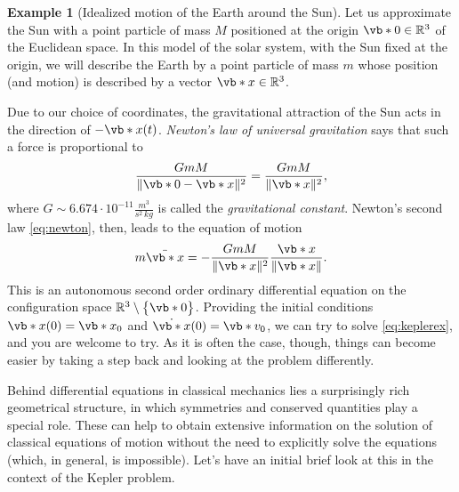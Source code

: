 \documentclass[english,fontsize=11pt,paper=b5]{scrbook}
\theoremstyle{definition}
\newtheorem{example}{Example}[chapter]
\newcommand{\emphidx}[1]{\index{#1}\emph{#1}}
\begin{document}
  \begin{example}[Idealized motion of the Earth around the Sun]\label{ex:Kepler0}
    Let us approximate the Sun with a point particle of mass $M$ positioned at the origin $\vb*{0}\in\mathbb{R}^3$ of the Euclidean space.
    In this model of the solar system, with the Sun fixed at the origin, we will describe the Earth by a point particle of mass $m$ whose position (and motion) is described by a vector $\vb*{x}\in\mathbb{R}^3$.

    Due to our choice of coordinates, the gravitational attraction of the Sun acts in the direction of $-\vb*{x}(t)$.
    \emph{Newton's law of universal gravitation}  says that such a force is proportional to
    \begin{equation}
      \frac{GmM}{\|\vb*{0}-\vb*{x}\|^2} = \frac{GmM}{\|\vb*{x}\|^2},
    \end{equation}
    where $G \sim 6.674 \cdot 10^{-11} \frac{m^3}{s^2\,kg}$ is called the \emphidx{gravitational constant}.
    Newton's second law \eqref{eq:newton}, then, leads to the equation of motion
    \begin{equation}\label{eq:keplerex}
      m \ddot{\vb*{x}} = - \frac{GmM}{\|\vb*{x}\|^2} \frac{\vb*{x}}{\|\vb*{x}\|}.
    \end{equation}
    This is an autonomous second order ordinary differential equation on the configuration space $\mathbb{R}^3\setminus\big\{\vb*{0}\big\}$.
    Providing the initial conditions $\vb*{x}(0)=\vb*{x}_0$ and $\dot{\vb*{x}}(0)=\vb*{v}_0$, we can try to solve \eqref{eq:keplerex}, and you are welcome to try.
    As it is often the case, though, things can become easier by taking a step back and looking at the problem differently.\medskip

    Behind differential equations in classical mechanics lies a surprisingly rich geometrical structure, in which symmetries and conserved quantities play a special role.
    These can help to obtain extensive information on the solution of classical equations of motion without the need to explicitly solve the equations (which, in general, is impossible).
    Let's have an initial brief look at this in the context of the Kepler problem.


\end{example}
\end{document}
